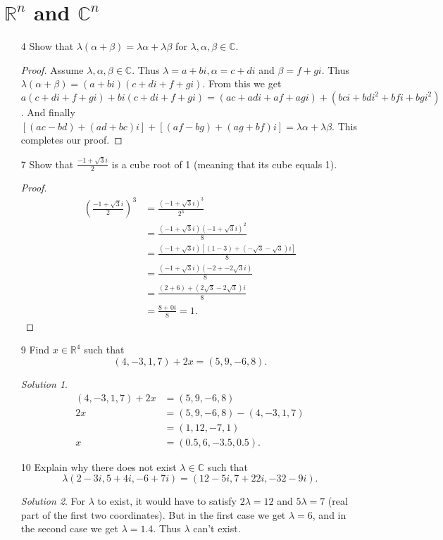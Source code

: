 \documentclass[11pt, b5paper, draft, fleqn]{book}
\theoremstyle{remark}
\newtheorem*{solution}{Solution}
\begin{document}
\section{\(\mathbb{R}^n\) and \(\mathbb{C}^n\)}
\begin{enumerate}
    \item[4]
	Show that \(\lambda(\alpha + \beta) = \lambda\alpha + \lambda\beta\) for \(\lambda, \alpha, \beta \in \mathbb{C}\).
	\begin{proof}
		Assume \(\lambda, \alpha, \beta \in \mathbb{C}\). Thus \(\lambda = a+bi, \alpha = c+di\) and \(\beta = f+gi\). Thus \(\lambda(\alpha + \beta) = (a+bi)(c+di + f+gi)\). From this we get \(a(c+di + f+gi) + bi(c+di + f+gi) = (ac + adi + af+ agi) + (bci + bdi^2 +bfi + bgi^2)\). And finally \(\left[(ac - bd) + (ad + bc)i\right] + \left[(af - bg) + (ag + bf)i\right] = \lambda\alpha + \lambda\beta\). This completes our proof.
	\end{proof}
	\item[7] Show that \(\frac{-1+\sqrt{3}i}{2}\) is a cube root of 1 (meaning that its cube equals 1).
	\begin{proof}
		\begin{equation*}
		\begin{split}
			\left(\frac{-1 + \sqrt{3}i}{2}\right)^3 & = \frac{(-1 + \sqrt{3}i)^3}{2^3} \\
			& = \frac{(-1 + \sqrt{3}i) (-1 + \sqrt{3}i)^2}{8} \\
			& = \frac{(-1 + \sqrt{3}i)\left[(1 - 3)+(-\sqrt{3} - \sqrt{3})i\right]}{8} \\
			& = \frac{(-1 + \sqrt{3}i) (-2 + -2\sqrt{3}i)}{8} \\
			& = \frac{(2 + 6) + (2\sqrt{3}-2\sqrt{3})i}{8} \\
			& = \frac{8 + 0i}{8} = 1.
		\end{split}
		\end{equation*}
	\end{proof}
	\item[9] Find \(x \in \mathbb{R}^4\) such that \[(4, -3, 1, 7) + 2x = (5, 9, -6, 8).\]
	\begin{solution}
		\begin{equation*}
		\begin{split}
			(4, -3, 1, 7) + 2x & = (5, 9, -6, 8) \\
			2x & = (5, 9, -6, 8) - (4, -3, 1, 7) \\
			& = (1, 12, -7, 1) \\
			x & = (0.5, 6, -3.5, 0.5).
		\end{split}
		\end{equation*}
	\end{solution}
	\item[10] Explain why there does not exist \(\lambda \in \mathbb{C}\) such that \[\lambda(2 - 3i, 5 + 4i, -6 + 7i) = (12 - 5i, 7 + 22i, -32 - 9i).\]
	\begin{solution}
		For \(\lambda\) to exist, it would have to satisfy \(2 \lambda = 12\) and \(5 \lambda = 7\) (real part of the first two coordinates). But in the first case we get \(\lambda = 6\), and in the second case we get \(\lambda = 1.4\). Thus \(\lambda\) can't exist.
	\end{solution}
\end{enumerate}
\end{document}
